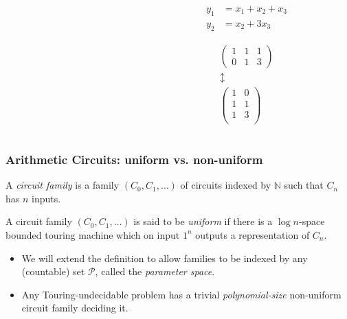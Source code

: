 \documentclass[10pt]{beamer}
\newcommand{\N}{\mathbb{N}}
\begin{document}
\begin{frame}
\begin{columns}
\begin{column}{0.6\textwidth}
    \end{column}
    \begin{column}{0.4\textwidth}
      \begin{align*}
        y_1 &= x_1 + x_2 + x_3\\
        y_2 &= x_2 + 3x_3
      \end{align*}
      
      \Large
      \begin{gather*}
        \begin{pmatrix}
          1 & 1 & 1\\
          0 & 1 & 3
        \end{pmatrix}\\
        \updownarrow\\
        \begin{pmatrix}
          1 & 0\\
          1 & 1\\
          1 & 3\\
        \end{pmatrix}
      \end{gather*}
    \end{column}
  \end{columns}
\end{frame}


\begin{frame}
  \frametitle{Arithmetic Circuits: uniform vs. non-uniform}

  \begin{definition}
    A \emph{circuit family} is a family $(C_0,C_1,\ldots)$ of circuits
    indexed by $\N$ such that $C_n$ has $n$ inputs.
  \end{definition}

  \begin{definition}
    A circuit family $(C_0,C_1,\ldots)$ is said to be \emph{uniform}
    if there is a $\log n$-space bounded touring machine which on
    input $1^n$ outputs a representation of $C_n$.
  \end{definition}

  \begin{itemize}
  \item We will extend the definition to allow families to be indexed
    by any (countable) set $\mathcal{P}$, called the \emph{parameter
      space}.
  \item \alert{Any Touring-undecidable problem has a trivial
      \emph{polynomial-size} non-uniform circuit family deciding it.}
  \end{itemize}
\end{frame}
\end{document}
